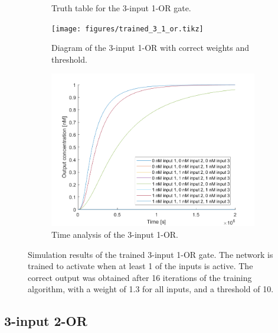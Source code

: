 \begin{figure}[H]
\begin{subfigure}[t]{.49\columnwidth}
\begin{adjustbox}{width=\textwidth}
\begin{tabular}[b]{cccc}
    \hline
    \end{tabular}
  \end{adjustbox}
    \caption{Truth table for the 3-input 1-OR gate.}
\end{subfigure}
\begin{subfigure}[t]{.49\textwidth}
  \texttt{[image: figures/trained\_3\_1\_or.tikz]}
  \caption{Diagram of the 3-input 1-OR with correct weights and threshold.}
\end{subfigure}
\hfill
\begin{subfigure}[t]{\textwidth}
  \centering
\includegraphics[width=\textwidth]{images/or_1_simulation_3input.png}
\caption{Time analysis of the 3-input 1-OR.}
\end{subfigure}
\caption{Simulation results of the trained 3-input 1-OR gate. The network is trained to activate when at least 1 of the inputs is active. The correct output was obtained after 16 iterations of the training algorithm, with a weight of 1.3 for all inputs, and a threshold of 10.}
\label{3_1_or}
\end{figure}

\subsection{3-input 2-OR}


